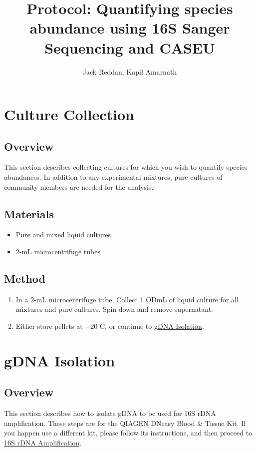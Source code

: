 \documentclass[twocolumn]{article}
\begin{document}
\title{Protocol: Quantifying species abundance using 16S Sanger Sequencing and CASEU}
\author{Jack Reddan, Kapil Amarnath}

\maketitle{}

\tableofcontents{}

\section{Culture Collection}\label{CC}
\subsection{Overview}
This section describes collecting cultures for which you wish to quantify species abundances.
In addition to any experimental mixtures,
pure cultures of community members are needed for the analysis.

\subsection{Materials}
\begin{itemize}
  \item Pure and mixed liquid cultures
  \item 2-mL microcentrifuge tubes
\end{itemize}

\subsection{Method}
\begin{enumerate}
  \item In a 2-mL microcentrifuge tube, Collect 1 ODmL of liquid culture for all mixtures and pure cultures. Spin-down and remove supernatant.
  \item Either store pellets at $-20^\circ$C, or continue to \hyperref[GI]{gDNA Isolation}.
\end{enumerate}

\section{gDNA Isolation}\label{GI}
\subsection{Overview}
This section describes how to isolate gDNA to be used for 16S rDNA amplification.
These steps are for the QIAGEN DNeasy Blood \& Tissue Kit.
If you happen use a different kit,
please follow its instructions,
and then proceed to \hyperref[1rA]{16S rDNA Amplification}.
\end{document}
